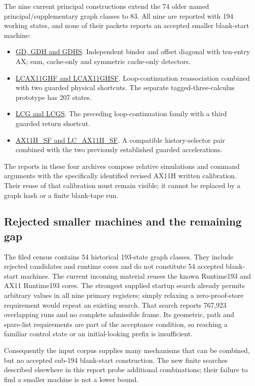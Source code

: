 The nine current principal constructions extend the 74 older named
principal/supplementary graph classes to 83.  All nine are reported with
194 working states, and none of their packets reports an accepted smaller
blank-start machine:
\begin{itemize}
\item \href{https://github.com/VladimirReshetnikov/ProveIt/blob/793c68737d94bffa4e32a75bce6cc8058d6d22f0/docs/incoming/pa194_gd_research_2026-11-14.zip}{GD, GDH and GDHS}. Independent binder and offset diagonal with ten-entry AX; sum, cache-only and symmetric cache-only detectors.
\item \href{https://github.com/VladimirReshetnikov/ProveIt/blob/793c68737d94bffa4e32a75bce6cc8058d6d22f0/docs/incoming/pa194_lcfast_tagged_research_2026-11-14.zip}{LCAX11GHF and LCAX11GHSF}. Loop-continuation reassociation combined with two guarded physical shortcuts. The separate tagged-three-calculus prototype has 207 states.
\item \href{https://github.com/VladimirReshetnikov/ProveIt/blob/793c68737d94bffa4e32a75bce6cc8058d6d22f0/docs/incoming/pa194_loop_return_2026-11-14.zip}{LCG and LCGS}. The preceding loop-continuation family with a third guarded return shortcut.
\item \href{https://github.com/VladimirReshetnikov/ProveIt/blob/793c68737d94bffa4e32a75bce6cc8058d6d22f0/docs/incoming/pa194_comparison_and_new_designs_2026-11-15.zip}{AX11H\_SF and LC\_AX11H\_SF}. A compatible history-selector pair combined with the two previously established guarded accelerations.
\end{itemize}
The reports in these four archives compose relative simulations and command
arguments with the specifically identified revised AX11H written
calibration.  Their reuse of that calibration must remain visible; it
cannot be replaced by a graph hash or a finite blank-tape run.

\subsection{Rejected smaller machines and the remaining gap}

The filed census contains 54 historical 193-state graph classes.  They
include rejected candidates and runtime cores and do not constitute 54
accepted blank-start machines.  The current incoming material reuses the
known Runtime193 and AX11 Runtime193 cores.  The strongest supplied startup
search already permits arbitrary values in all nine primary registers;
simply relaxing a zero-proof-store requirement would repeat an existing
search.  That search reports 767,923 overlapping runs and no complete
admissible frame.  Its geometric, path and spare-list requirements are part
of the acceptance condition, so reaching a familiar control state or an
initial-looking prefix is insufficient.

Consequently the input corpus supplies many mechanisms that can be
combined, but no accepted sub-194 blank-start construction.  The new finite
searches described elsewhere in this report probe additional combinations;
their failure to find a smaller machine is not a lower bound.

